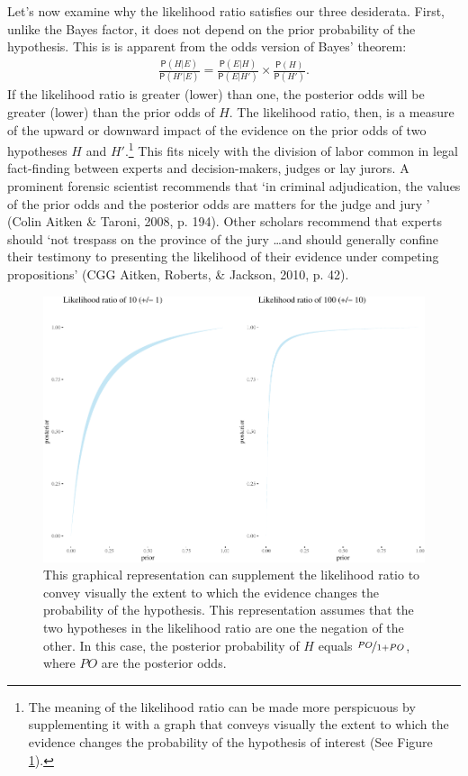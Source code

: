 \documentclass[
  10pt,
  dvipsnames,enabledeprecatedfontcommands]{scrartcl}
\newcommand{\pr}[1]{\mathsf{P}(#1)}
\begin{document}
Let's now examine why the likelihood ratio satisfies our three
desiderata. First, unlike the Bayes factor, it does not depend on the
prior probability of the hypothesis. This is is apparent from the odds
version of Bayes' theorem: \begin{align}\label{eq:BTodds}
\frac{\pr{H \vert E}}{\pr{H' \vert E}}= \frac{\pr{E \vert H}}{\pr{E \vert H'}}\times \frac{\pr{H}}{\pr{H'}}.
\end{align} \noindent If the likelihood ratio is greater (lower) than
one, the posterior odds will be greater (lower) than the prior odds of
\(H\). The likelihood ratio, then, is a measure of the upward or
downward impact of the evidence on the prior odds of two hypotheses
\(H\) and \(H'\).\footnote{The meaning of the likelihood ratio can be
  made more perspicuous by supplementing it with a graph that conveys
  visually the extent to which the evidence changes the probability of
  the hypothesis of interest (See Figure \ref{fig:effect-evidence}).}
This fits nicely with the division of labor common in legal fact-finding
between experts and decision-makers, judges or lay jurors. A prominent
forensic scientist recommends that `in criminal adjudication, the values
of the prior odds and the posterior odds are matters for the judge and
jury ' (Colin Aitken \& Taroni, 2008, p. 194). Other scholars recommend
that experts should `not trespass on the province of the jury \dots and
should generally confine their testimony to presenting the likelihood of
their evidence under competing propositions' (CGG Aitken, Roberts, \&
Jackson, 2010, p. 42).

\begin{figure}[h]

\begin{center}\includegraphics[width=1\linewidth]{lr-chapter4_files/figure-latex/effect-evidence-b-1} \end{center}
\caption{This graphical representation can supplement the likelihood ratio to convey visually the extent to which the evidence changes the probability of the hypothesis. This representation assumes that the two hypotheses in the likelihood ratio are one the negation of the other. In this case, the posterior probability of $H$ equals $\nicefrac{PO}{1+PO}$, where $PO$ are the posterior odds.}
\label{fig:effect-evidence}
\end{figure}
\end{document}
